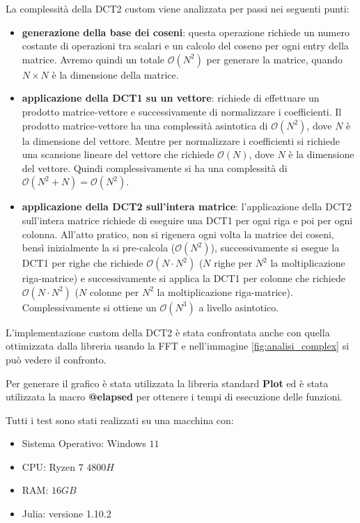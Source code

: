 La complessità della DCT2 custom viene analizzata per passi nei seguenti punti:
\begin{itemize}
    \item \textbf{generazione della base dei coseni}: questa operazione richiede
          un numero costante di operazioni tra scalari e un calcolo del coseno per ogni
          entry della matrice. Avremo quindi un totale $\mathcal{O}(N^2)$ per generare
          la matrice, quando $N\times N$ è la dimensione della matrice.
    \item \textbf{applicazione della DCT1 su un vettore}: richiede di effettuare
          un prodotto matrice-vettore e successivamente di normalizzare i coefficienti.
          Il prodotto matrice-vettore ha una complessità asintotica di
          $\mathcal{O}(N^2)$, dove $N$ è la dimensione del vettore. Mentre per
          normalizzare i coefficienti si richiede una scansione
          lineare del vettore che richiede $\mathcal{O}(N)$, dove $N$ è la dimensione
          del vettore. Quindi complessivamente si ha una complessità di $\mathcal{O}(N^2 + N) = \mathcal{O}(N^2)$.
    \item \textbf{applicazione della DCT2 sull'intera matrice}: l'applicazione della DCT2
          sull'intera matrice richiede di eseguire una DCT1 per ogni riga e poi per ogni
          colonna. All'atto pratico, non si rigenera ogni volta la matrice dei coseni,
          bensì inizialmente la si pre-calcola ($\mathcal{O}(N^2)$), successivamente si
          esegue la DCT1 per righe che richiede $\mathcal{O}(N \cdot N^2)$ ($N$ righe
          per $N^2$ la moltiplicazione riga-matrice) e successivamente si applica la
          DCT1 per colonne che richiede $\mathcal{O}(N \cdot N^2)$ ($N$ colonne
          per $N^2$ la moltiplicazione riga-matrice). Complessivamente si ottiene
          un $\mathcal{O}(N^3)$ a livello asintotico.
\end{itemize}

L'implementazione custom della DCT2 è stata confrontata anche con quella ottimizzata
dalla libreria usando la FFT e nell'immagine \ref{fig:analisi_complex} si
può vedere il confronto.

Per generare il grafico è stata utilizzata la libreria standard \textbf{Plot} ed
è stata utilizzata la macro \textbf{@elapsed} per ottenere i tempi di esecuzione
delle funzioni.

Tutti i test sono stati realizzati su una macchina con:
\begin{itemize}
    \item Sistema Operativo: Windows $11$
    \item CPU: Ryzen $7$ $4800H$
    \item RAM: $16GB$
    \item Julia: versione 1.10.2
\end{itemize}

